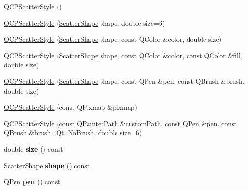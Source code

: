 \begin{DoxyCompactItemize}
\item 
\hyperlink{class_q_c_p_scatter_style_a8836018d9ad83ccd8870de8315c1be73}{Q\+C\+P\+Scatter\+Style} ()
\item 
\hyperlink{class_q_c_p_scatter_style_a003d92f74f4561eda111862eadd62f28}{Q\+C\+P\+Scatter\+Style} (\hyperlink{class_q_c_p_scatter_style_adb31525af6b680e6f1b7472e43859349}{Scatter\+Shape} shape, double size=6)
\item 
\hyperlink{class_q_c_p_scatter_style_afa059da858c864c7e05871dc602d7eab}{Q\+C\+P\+Scatter\+Style} (\hyperlink{class_q_c_p_scatter_style_adb31525af6b680e6f1b7472e43859349}{Scatter\+Shape} shape, const Q\+Color \&color, double size)
\item 
\hyperlink{class_q_c_p_scatter_style_a6e1b64f12cac7f07af180ae4316fd38d}{Q\+C\+P\+Scatter\+Style} (\hyperlink{class_q_c_p_scatter_style_adb31525af6b680e6f1b7472e43859349}{Scatter\+Shape} shape, const Q\+Color \&color, const Q\+Color \&fill, double size)
\item 
\hyperlink{class_q_c_p_scatter_style_a85acc4941d7e5c9bca5fa51377a77f49}{Q\+C\+P\+Scatter\+Style} (\hyperlink{class_q_c_p_scatter_style_adb31525af6b680e6f1b7472e43859349}{Scatter\+Shape} shape, const Q\+Pen \&pen, const Q\+Brush \&brush, double size)
\item 
\hyperlink{class_q_c_p_scatter_style_a63962094587a4c2258435aa7933996cc}{Q\+C\+P\+Scatter\+Style} (const Q\+Pixmap \&pixmap)
\item 
\hyperlink{class_q_c_p_scatter_style_a879c30647683b3cfbde2afecea815e6f}{Q\+C\+P\+Scatter\+Style} (const Q\+Painter\+Path \&custom\+Path, const Q\+Pen \&pen, const Q\+Brush \&brush=Qt\+::\+No\+Brush, double size=6)
\item 
\mbox{\label{class_q_c_p_scatter_style_a0e94526d9165d9f50e262102bdd71a47}} 
double {\bfseries size} () const
\item 
\mbox{\label{class_q_c_p_scatter_style_af04cad55bd7f58a96da4fc6bc46a0a1e}} 
\hyperlink{class_q_c_p_scatter_style_adb31525af6b680e6f1b7472e43859349}{Scatter\+Shape} {\bfseries shape} () const
\item 
\mbox{\label{class_q_c_p_scatter_style_acdd6313d16e69d3810e9d1f48dd9e4bb}} 
Q\+Pen {\bfseries pen} () const
\item 
\mbox{\label{class_q_c_p_scatter_style_adc4f66aed84f1d7a3a5aabf4f48f31a6}} 

\end{DoxyCompactItemize}
